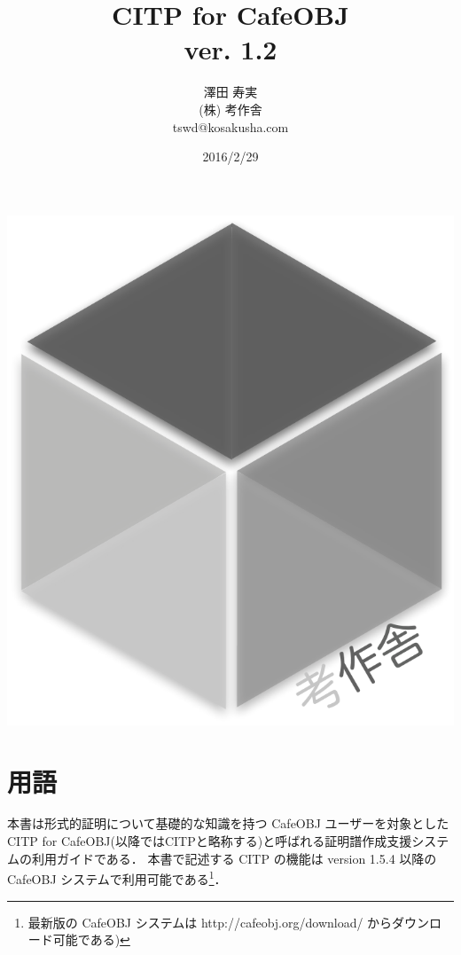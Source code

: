 \documentclass[a4paper,oneside,10pt,here]{memoir}
\begin{document}
\tightlists
\sloppy
\raggedbottom
{}
\frontmatter
\pagestyle{empty}
\title{CITP for CafeOBJ \\
ver. 1.2}
\vfill
\author{澤田 寿実\\
  (株) 考作舎\\
  tswd@kosakusha.com}
\date{2016/2/29}
\maketitle
\vfill
\begin{center}
\includegraphics[scale=0.2]{kosakusha2_gray.pdf}
\end{center}
\vfill
\thispagestyle{empty}
\newpage
\mainmatter
\pagestyle{plain}
\tableofcontents
\EnableBpAbbreviations
\newpage
\chapter{用語}\label{sec:terms}
本書は形式的証明について基礎的な知識を持つ CafeOBJ ユーザーを対象とした
CITP for CafeOBJ(以降ではCITPと略称する)と呼ばれる証明譜作成支援システムの利用ガイドである．
本書で記述する CITP の機能は version 1.5.4 以降のCafeOBJ システムで利用可能である\footnote{最新版の CafeOBJ システムは http://cafeobj.org/download/ からダウンロード可能である)}．
\end{document}
